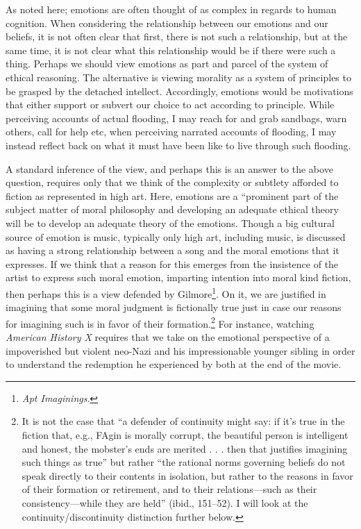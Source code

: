 \documentclass[phdthesis,12pt,final,a4paper]{wuthesis}
\theoremstyle{definition}
\theoremstyle{definition}
\theoremstyle{definition}
\theoremstyle{definition}
\theoremstyle{remark}
\begin{document}
As noted here; emotions are often thought of as complex in regards to human cognition. When considering the relationship between our emotions and our beliefs, it is not often clear that first, there is not such a relationship, but at the same time, it is not clear what this relationship would be if there were such a thing. Perhaps we should view emotions as part and parcel of the system of ethical reasoning. The alternative is viewing morality as a system of principles to be grasped by the detached intellect. Accordingly, emotions would be motivations that either support or subvert our choice to act according to principle. While perceiving accounts of actual flooding, I may reach for and grab sandbags, warn others, call for help etc, when perceiving narrated accounts of flooding, I may instead reflect back on what it must have been like to live through such flooding.

A standard inference of the view, and perhaps this is an answer to the above question, requires only that we think of the complexity or subtlety afforded to fiction as represented in high art. Here, emotions are a ``prominent part of the subject matter of moral philosophy and developing an adequate ethical theory will be to develop an adequate theory of the emotions. Though a big cultural source of emotion is music, typically only high art, including music, is discussed as having a strong relationship between a song and the moral emotions that it expresses. If we think that a reason for this emerges from the insistence of the artist to express such moral emotion, imparting intention into moral kind fiction, then perhaps this is a view defended by Gilmore\footnote{\emph{Apt {Imaginings}}.}. On it, we are justified in imagining that some moral judgment is fictionally true just in case our reasons for imagining such is in favor of their formation.\footnote{It is not the case that ``a defender of continuity might say: if it's true in the fiction that, e.g., FAgin is morally corrupt, the beautiful person is intelligent and honest, the mobster's ends are merited . . . then that justifies imagining such things as true'' but rather ``the rational norms governing beliefs do not speak directly to their contents in isolation, but rather to the reasons in favor of their formation or retirement, and to their relations---such as their consistency---while they are held'' (ibid., 151--52). I will look at the continuity/discontinuity distinction further below.} For instance, watching \emph{American History X} requires that we take on the emotional perspective of a impoverished but violent neo-Nazi and his impressionable younger sibling in order to understand the redemption he experienced by both at the end of the movie.
\end{document}
